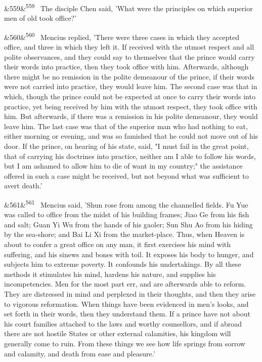 \documentclass[12pt]{article}
\newcommand{\para}[1][]{\par\noindent\ifx&#1&\else\textsuperscript{\footnotesize #1}~\fi}
\begin{document}
\para[559] The disciple Chen said, 'What were the principles on which superior men of old took office?'

\para[560] Mencius replied, 'There were three cases in which they accepted office, and three in which they left it. If received with the utmost respect and all polite observances, and they could say to themselves that the prince would carry their words into practice, then they took office with him. Afterwards, although there might be no remission in the polite demeanour of the prince, if their words were not carried into practice, they would leave him. The second case was that in which, though the prince could not be expected at once to carry their words into practice, yet being received by him with the utmost respect, they took office with him. But afterwards, if there was a remission in his polite demeanour, they would leave him. The last case was that of the superior man who had nothing to eat, either morning or evening, and was so famished that he could not move out of his door. If the prince, on hearing of his state, said, "I must fail in the great point, that of carrying his doctrines into practice, neither am I able to follow his words, but I am ashamed to allow him to die of want in my country;" the assistance offered in such a case might be received, but not beyond what was sufficient to avert death.'

\para[561] Mencius said, 'Shun rose from among the channelled fields. Fu Yue was called to office from the midst of his building frames; Jiao Ge from his fish and salt; Guan Yi Wu from the hands of his gaoler; Sun Shu Ao from his hiding by the sea-shore; and Bai Li Xi from the market-place. Thus, when Heaven is about to confer a great office on any man, it first exercises his mind with suffering, and his sinews and bones with toil. It exposes his body to hunger, and subjects him to extreme poverty. It confounds his undertakings. By all these methods it stimulates his mind, hardens his nature, and supplies his incompetencies. Men for the most part err, and are afterwards able to reform. They are distressed in mind and perplexed in their thoughts, and then they arise to vigorous reformation. When things have been evidenced in men's looks, and set forth in their words, then they understand them. If a prince have not about his court families attached to the laws and worthy counsellors, and if abroad there are not hostile States or other external calamities, his kingdom will generally come to ruin. From these things we see how life springs from sorrow and calamity, and death from ease and pleasure.'
\end{document}
